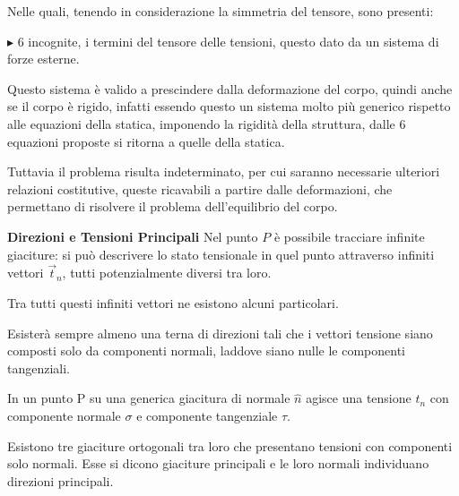 \documentclass{article}
\begin{document}
\begin{adjustwidth}{2in}{}
	Nelle quali, tenendo in considerazione la simmetria del tensore, sono presenti: \newline

	$\blacktriangleright$	6 incognite, i termini del tensore delle tensioni, questo dato da un sistema di forze esterne. \newline
	
	Questo sistema è valido a prescindere dalla deformazione del corpo, quindi anche
	se il corpo è rigido, infatti essendo questo un sistema molto più generico rispetto alle equazioni della statica, imponendo la rigidità della struttura, dalle 6 equazioni proposte si ritorna a quelle della statica. \newline 
	
	Tuttavia il problema risulta indeterminato, per cui saranno necessarie
	ulteriori relazioni costitutive, queste ricavabili a partire dalle deformazioni, che permettano di risolvere il problema dell'equilibrio del corpo. 
	
\newpage 
	
{\Large \textbf{Direzioni e Tensioni Principali} \newline}
	Nel punto $P$ è possibile tracciare infinite giaciture: si può descrivere lo stato tensionale in quel punto attraverso infiniti vettori $\vec{t}_n$, tutti potenzialmente diversi tra loro. 
	
	Tra tutti questi infiniti vettori ne esistono alcuni particolari. \newline 
	
	Esisterà sempre almeno una terna di direzioni tali che i vettori tensione siano composti solo da componenti normali, laddove siano nulle le componenti tangenziali. \newline	
	
	In un punto P su una generica giacitura di normale $\hat{n}$ agisce una tensione $ t_n $ con
	componente normale $ \sigma $ e componente tangenziale $ \tau $.
	
	Esistono tre giaciture ortogonali tra loro che presentano tensioni con componenti
	solo normali. Esse si dicono giaciture principali e le loro normali individuano direzioni principali. \newline 
	

\end{adjustwidth}
\end{document}
